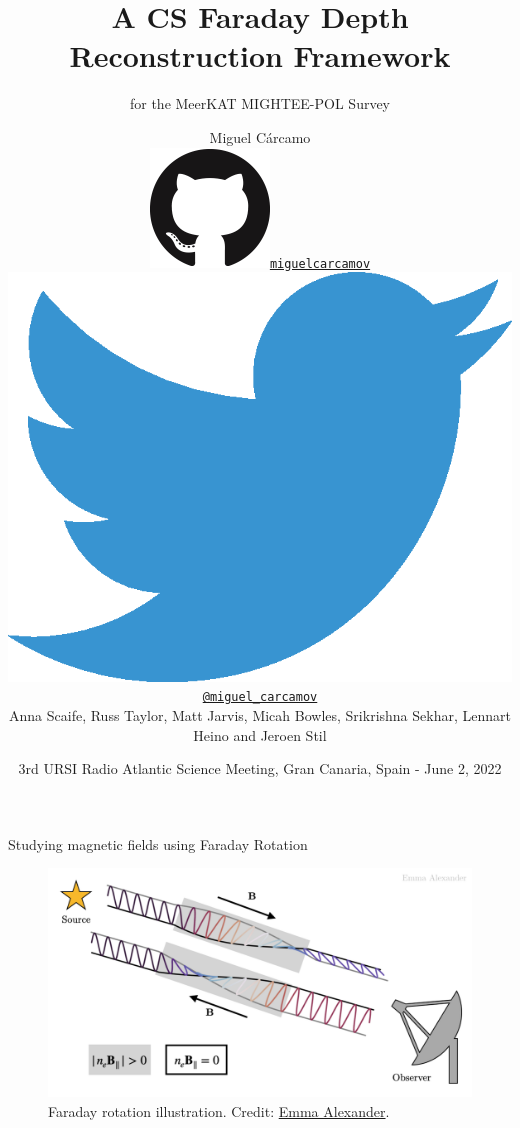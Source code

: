 \documentclass[xetex,aspectratio=169]{beamer}
\date{3rd URSI Radio Atlantic Science Meeting, Gran Canaria, Spain - June 2, 2022}
\title
    {A CS Faraday Depth Reconstruction Framework}
\subtitle
    { for the MeerKAT MIGHTEE-POL Survey}
\author
    {Miguel C\'arcamo\\
    \includegraphics[scale=0.08]{figures/logos/GitHub-Mark-120px-plus.png}\hspace{0.05cm}\href{https://www.github.com/miguelcarcamov}{\tt miguelcarcamov}\\
    \includegraphics[scale=0.05]{figures/logos/2021 Twitter logo - blue.eps}\hspace{0.05cm}\href{https://www.twitter.com/miguel_carcamov}{\tt @miguel\_carcamov}\\
    \vspace{0.5cm}
    Anna Scaife, Russ Taylor, Matt Jarvis, Micah Bowles, Srikrishna Sekhar, Lennart Heino and Jeroen Stil\\
    }
\begin{document}
    \frame[plain]{\titlepage}

    
    
    \begin{frame}{Studying magnetic fields using Faraday Rotation}
    \begin{figure}
			    \centering
			    \includegraphics[width=.8\textwidth]{figures/faraday_rot.png}
			    \caption*{Faraday rotation illustration. Credit: \href{https://emmaalexander.github.io/resources.html}{Emma Alexander}.}
			\end{figure}
    \end{frame}
    
\end{document}
